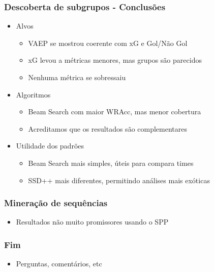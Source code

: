 \documentclass{beamer}
\begin{document}
\begin{frame}
\frametitle{Descoberta de subgrupos - Conclusões}
\begin{itemize}
    \item Alvos
    \begin{itemize}
        \item VAEP se mostrou coerente com xG e Gol/Não Gol
        \item xG levou a métricas menores, mas grupos são parecidos
        \item Nenhuma métrica se sobressaiu
    \end{itemize}
    \item Algoritmos
    \begin{itemize}
        \item Beam Search com maior WRAcc, mas menor cobertura
        \item Acreditamos que os resultados são complementares
    \end{itemize}
    \item Utilidade dos padrões
    \begin{itemize}
        \item Beam Search mais simples, úteis para compara times
        \item SSD++ mais diferentes, permitindo análises mais exóticas
    \end{itemize}
\end{itemize}
\end{frame}

\begin{frame}
\frametitle{Mineração de sequências}
\begin{itemize}
    \item Resultados não muito promissores usando o SPP
\end{itemize}
\end{frame}

\begin{frame}
\frametitle{Fim}
\begin{itemize}
    \item Perguntas, comentários, etc 
\end{itemize}
\end{frame}
\end{document}
